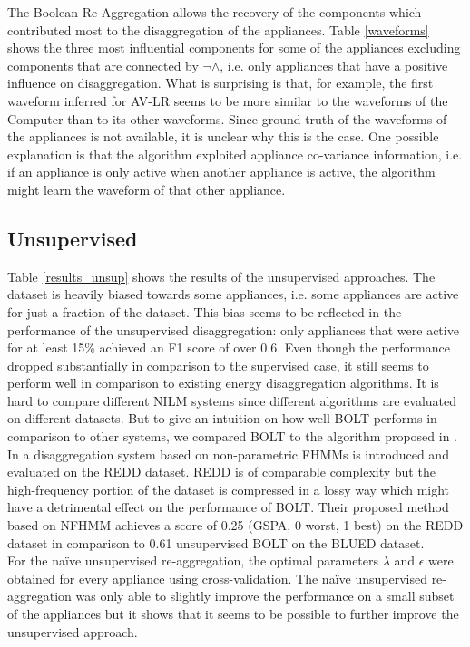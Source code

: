 The Boolean Re-Aggregation allows the recovery of the components which contributed most to the disaggregation of the appliances. Table \ref{waveforms} shows the three most influential components for some of the appliances excluding components that are connected by $\neg \land$, i.e. only appliances that have a positive influence on disaggregation. What is surprising is that, for example, the first waveform inferred for AV-LR seems to be more similar to the waveforms of the Computer than to its other waveforms. Since ground truth of the waveforms of the appliances is not available, it is unclear why this is the case. One possible explanation is that the algorithm exploited appliance co-variance information, i.e. if an appliance is only active when another appliance is active, the algorithm might learn the waveform of that other appliance.

\subsection{Unsupervised}
Table \ref{results_unsup} shows the results of the unsupervised approaches. The dataset is heavily biased towards some appliances, i.e. some appliances are active for just a fraction of the dataset. This bias seems to be reflected in the performance of the unsupervised disaggregation: only appliances that were active for at least 15\% achieved an F1 score of over 0.6. Even though the performance dropped substantially in comparison to the supervised case, it still seems to perform well in comparison to existing energy disaggregation algorithms. It is hard to compare different NILM systems since different algorithms are evaluated on different datasets. But to give an intuition on how well BOLT performs in comparison to other systems, we compared BOLT to the algorithm proposed in \cite{jiafully}. In \cite{jiafully} a disaggregation system based on non-parametric FHMMs is introduced and evaluated on the REDD \cite{kolter2011redd} dataset. REDD is of comparable complexity but the high-frequency portion of the dataset is compressed in a lossy way which might have a detrimental effect on the performance of BOLT. Their proposed method based on NFHMM achieves a score of 0.25 (GSPA, 0 worst, 1 best) on the REDD dataset in comparison to 0.61 unsupervised BOLT on the BLUED dataset.\\
For the na\"ive unsupervised re-aggregation, the optimal parameters $\lambda$ and $\epsilon$ were obtained for every appliance using cross-validation. The na\"ive unsupervised re-aggregation was only able to slightly improve the performance on a small subset of the appliances but it shows that it seems to be possible to further improve the unsupervised approach.

